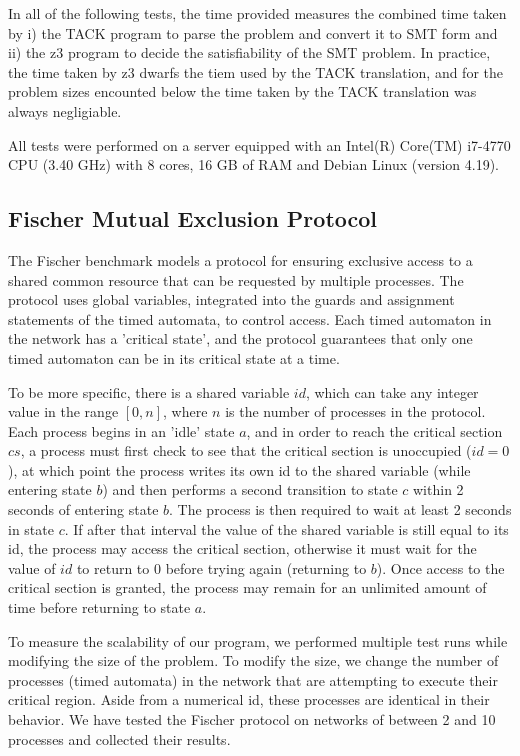 \documentclass[a4paper,12pt]{article}
\begin{document}
In all of the following tests, the time provided measures the combined time
taken by i) the TACK program to parse the problem and convert it to SMT form and
ii) the z3 program to decide the satisfiability of the SMT problem. In practice,
the time taken by z3 dwarfs the tiem used by the TACK translation, and for the
problem sizes encounted below the time taken by the TACK translation was always
negligiable.

All tests were performed on a server equipped with an Intel(R) Core(TM) i7-4770
CPU (3.40 GHz) with 8 cores, 16 GB of RAM and Debian Linux (version 4.19).

\subsection{Fischer Mutual Exclusion Protocol}
\label{sec:org0da130f}
The Fischer benchmark models a protocol for ensuring exclusive access to a
shared common resource that can be requested by multiple processes. The protocol
uses global variables, integrated into the guards and assignment statements of
the timed automata, to control access. Each timed automaton in the network has a
'critical state', and the protocol guarantees that only one timed automaton can
be in its critical state at a time.

To be more specific, there is a shared variable \(id\), which can take any
integer value in the range \([0,n]\), where \(n\) is the number of processes in the
protocol. Each process begins in an 'idle' state \(a\), and in order to reach the
critical section \(cs\), a process must first check to see that the critical
section is unoccupied (\(id=0\)), at which point the process writes its own id to
the shared variable (while entering state \(b\)) and then performs a second
transition to state \(c\) within 2 seconds of entering state \(b\). The process is
then required to wait at least 2 seconds in state \(c\). If after that interval
the value of the shared variable is still equal to its id, the process may access
the critical section, otherwise it must wait for the value of \(id\) to return
to \(0\) before trying again (returning to \(b\)). Once access to the critical
section is granted, the process may remain for an unlimited amount of time before
returning to state \(a\).

To measure the scalability of our program, we performed multiple test runs while
modifying the size of the problem. To modify the size, we change the number of
processes (timed automata) in the network that are attempting to execute their
critical region. Aside from a numerical id, these processes are identical in
their behavior. We have tested the Fischer protocol on networks of between 2 and
10 processes and collected their results.
\end{document}
